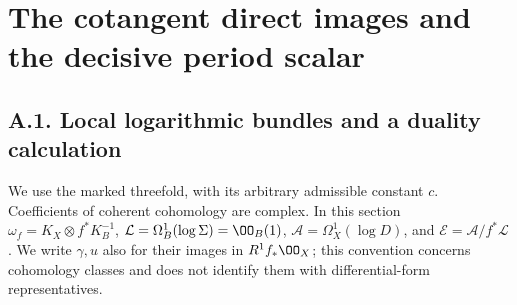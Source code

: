 \section{The cotangent direct images and the decisive period scalar}
\label{inv:sec:partA}

\subsection{A.1. Local logarithmic bundles and a duality calculation}

We use the marked threefold, with its arbitrary admissible
constant $c$.  Coefficients of coherent cohomology are complex.  In this
section $\omega_f=K_X\otimes f^*K_B^{-1}$,
$\mathcal L=\Omega_B^1(\log\Sigma)=\OO_B(1)$,
$\mathcal A=\Omega_X^1(\log D)$, and
$\mathcal E=\mathcal A/f^*\mathcal L$.  We write $\gamma,u$ also for
their images in $R^1f_*\OO_X$; this convention concerns cohomology
classes and does not identify them with differential-form representatives.

